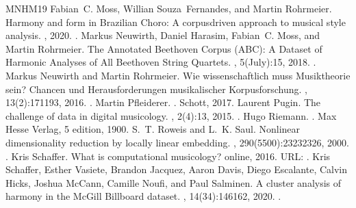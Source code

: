 \documentclass[letterpaper,10pt,english]{sphinxmanual}
\begin{document}
\begin{sphinxthebibliography}{MNHM19}
Fabian C. Moss, Willian Souza Fernandes, and Martin Rohrmeier. Harmony and form in Brazilian Choro: A corpus\sphinxhyphen{}driven approach to musical style analysis. , 2020. .
Markus Neuwirth, Daniel Harasim, Fabian C. Moss, and Martin Rohrmeier. The Annotated Beethoven Corpus (ABC): A Dataset of Harmonic Analyses of All Beethoven String Quartets. , 5(July):1\textendash{}5, 2018. .
Markus Neuwirth and Martin Rohrmeier. Wie wissenschaftlich muss Musiktheorie sein? Chancen und Herausforderungen musikalischer Korpusforschung. , 13(2):171\textendash{}193, 2016. .
Martin Pfleiderer. . Schott, 2017.
Laurent Pugin. The challenge of data in digital musicology. , 2(4):1\textendash{}3, 2015. .
Hugo Riemann. . Max Hesse Verlag, 5 edition, 1900.
S. T. Roweis and L. K. Saul. Nonlinear dimensionality reduction by locally linear embedding. , 290(5500):2323\textendash{}2326, 2000. .
Kris Schaffer. What is computational musicology? online, 2016. URL: .
Kris Schaffer, Esther Vasiete, Brandon Jacquez, Aaron Davis, Diego Escalante, Calvin Hicks, Joshua McCann, Camille Noufi, and Paul Salminen. A cluster analysis of harmony in the McGill Billboard dataset. , 14(3\textendash{}4):146\textendash{}162, 2020. .

\end{sphinxthebibliography}
\end{document}
